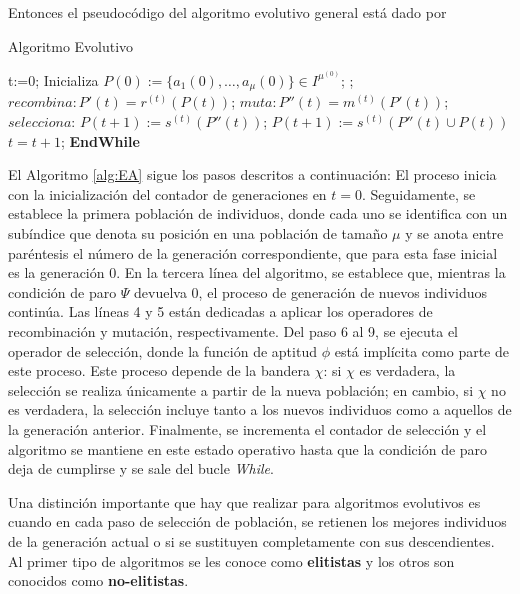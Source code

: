 Entonces el pseudocódigo del algoritmo evolutivo general está dado por

\begin{algorithm}
    \caption{Algoritmo Evolutivo}\label{alg:EA}
    \begin{algorithmic}[1] %
    \State t:=0;
    \State Inicializa $P(0):=\{a_1(0),\ldots,a_\mu(0)\} \in I^{\mu^{(0)}}$;
     \do ; 
        \State $\textit{recombina}: P'(t)=r^{(t)}(P(t))$;
        \State $\textit{muta}: P''(t)=m^{(t)}(P'(t))$;
        \State $\textit{selecciona}$:
            \If{$\chi$}
                \State $P(t +1):= s^{(t)}(P''(t))$;
                \Else  $P(t +1):= s^{(t)}(P''(t) \cup P(t))$
            \EndIf
    $t=t+1$;    
    \EndWhile
    \textbf{EndWhile}
\end{algorithmic}
\end{algorithm}

El Algoritmo \ref{alg:EA} sigue los pasos descritos a continuación: El proceso inicia con la inicialización del contador de generaciones en $t=0$. Seguidamente, se establece la primera población de individuos, donde cada uno se identifica con un subíndice que denota su posición en una población de tamaño $\mu$ y se anota entre paréntesis el número de la generación correspondiente, que para esta fase inicial es la generación 0. En la tercera línea del algoritmo, se establece que, mientras la condición de paro $\Psi$ devuelva 0, el proceso de generación de nuevos individuos continúa. Las líneas 4 y 5 están dedicadas a aplicar los operadores de recombinación y mutación, respectivamente. Del paso 6 al 9, se ejecuta el operador de selección, donde la función de aptitud $\phi$ está implícita como parte de este proceso. Este proceso depende de la bandera $\chi$: si $\chi$ es verdadera, la selección se realiza únicamente a partir de la nueva población; en cambio, si $\chi$ no es verdadera, la selección incluye tanto a los nuevos individuos como a aquellos de la generación anterior. Finalmente, se incrementa el contador de selección y el algoritmo se mantiene en este estado operativo hasta que la condición de paro deja de cumplirse y se sale del bucle \textit{While}.

Una distinción importante que hay que realizar para algoritmos evolutivos es cuando en cada paso de selección de población, se retienen los mejores individuos de la generación actual o si se sustituyen completamente con sus descendientes. Al primer tipo de algoritmos se les conoce como \textbf{elitistas} y los otros son conocidos como \textbf{no-elitistas}. 

